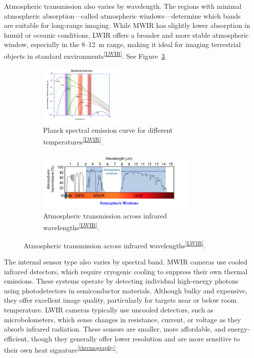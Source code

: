 Atmospheric transmission also varies by wavelength. The regions with minimal atmospheric absorption—called atmospheric windows—determine which bands are suitable for long-range imaging. While MWIR has slightly lower absorption in humid or oceanic conditions, LWIR offers a broader and more stable atmospheric window, especially in the 8–12~\textmu m range, making it ideal for imaging terrestrial objects in standard environments\textsuperscript{\ref{LWIR}}. See Figure~\ref{fig:atmos_window}.

\begin{figure}[h!]
    \centering
    \begin{subfigure}[b]{0.48\linewidth}
        \centering
        \includegraphics[height=3cm]{figs/Huirui/wien_law_plot.png}
        \caption{Planck spectral emission curve for different temperatures\textsuperscript{\ref{LWIR}}.}
        \label{fig:wien_law}
    \end{subfigure}
    \hfill
    \begin{subfigure}[b]{0.48\linewidth}
        \centering
        \includegraphics[height=3cm]{figs/Huirui/atmospheric_window_plot.png}
        \caption{Atmospheric transmission across infrared wavelengths\textsuperscript{\ref{LWIR}}.}
        \label{fig:atmos_window}
    \end{subfigure}
\end{figure}

The internal sensor type also varies by spectral band. MWIR cameras use cooled infrared detectors, which require cryogenic cooling to suppress their own thermal emissions. These systems operate by detecting individual high-energy photons using photodetectors in semiconductor materials. Although bulky and expensive, they offer excellent image quality, particularly for targets near or below room temperature. LWIR cameras typically use uncooled detectors, such as microbolometers, which sense changes in resistance, current, or voltage as they absorb infrared radiation. These sensors are smaller, more affordable, and energy-efficient, though they generally offer lower resolution and are more sensitive to their own heat signature\textsuperscript{\ref{thermography}}.

